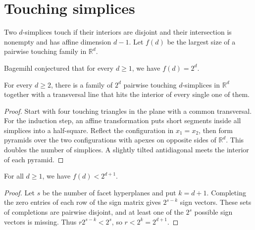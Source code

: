 \chapter{Touching simplices}

Two \(d\)-simplices touch if their interiors are disjoint and their
intersection is nonempty and has affine dimension \(d-1\).
Let \(f(d)\) be the largest size of a pairwise touching family in
\(\mathbb{R}^d\).

Bagemihl conjectured that for every \(d\ge 1\), we have \(f(d)=2^d\).

\begin{theorem}
  \label{ch16theorem1}
  \leanok
  For every \(d\ge 2\), there is a family of \(2^d\) pairwise touching
  \(d\)-simplices in \(\mathbb{R}^d\) together with a transversal line that hits the interior
  of every single one of them.
\end{theorem}
\begin{proof}
  \leanok
  Start with four touching triangles in the plane with a common transversal.
  For the induction step, an affine transformation puts short segments
  inside all simplices into a half-square. Reflect the configuration in
  \(x_1=x_2\), then form pyramids over the two configurations with apexes
  on opposite sides of \(\mathbb{R}^d\). This doubles the number of simplices.
  A slightly tilted antidiagonal meets the interior of each pyramid.
\end{proof}

\begin{theorem}
  \label{ch16theorem2}
  \leanok
  For all \(d \ge 1\), we have \(f(d)< 2^{d+1}\).
\end{theorem}
\begin{proof}
  \leanok
  Let \(s\) be the number of facet hyperplanes and put \(k=d+1\).
  Completing the zero entries of each row of the sign matrix gives
  \(2^{s-k}\) sign vectors. These sets of completions are pairwise disjoint,
  and at least one of the \(2^s\) possible sign vectors is missing.
  Thus \(r2^{s-k}<2^s\), so \(r<2^k=2^{d+1}\).
\end{proof}
